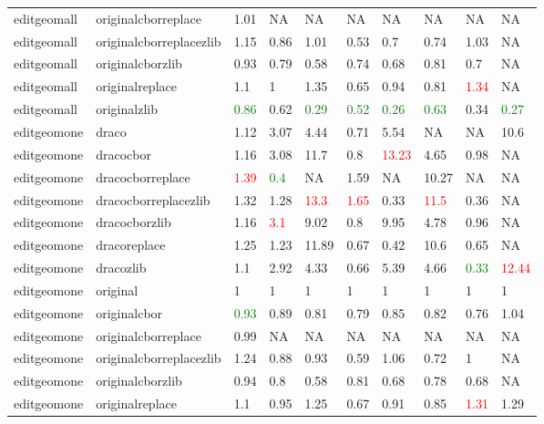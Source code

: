 \begin{landscape}
\begin{longtable}{llllllllll}
editgeomall & originalcborreplace & 1.01 & NA & NA & NA & NA & NA & NA & NA\\
editgeomall & originalcborreplacezlib & 1.15 & 0.86 & 1.01 & 0.53 & 0.7 & 0.74 & 1.03 & NA\\
editgeomall & originalcborzlib & 0.93 & 0.79 & 0.58 & 0.74 & 0.68 & 0.81 & 0.7 & NA\\
editgeomall & originalreplace & 1.1 & 1 & 1.35 & 0.65 & 0.94 & 0.81 & \textcolor{red}{1.34} & NA\\
editgeomall & originalzlib & \textcolor{green}{0.86} & 0.62 & \textcolor{green}{0.29} & \textcolor{green}{0.52} & \textcolor{green}{0.26} & \textcolor{green}{0.63} & 0.34 & \textcolor{green}{0.27}\\
editgeomone & draco & 1.12 & 3.07 & 4.44 & 0.71 & 5.54 & NA & NA & 10.6\\
editgeomone & dracocbor & 1.16 & 3.08 & 11.7 & 0.8 & \textcolor{red}{13.23} & 4.65 & 0.98 & NA\\
editgeomone & dracocborreplace & \textcolor{red}{1.39} & \textcolor{green}{0.4} & NA & 1.59 & NA & 10.27 & NA & NA\\
editgeomone & dracocborreplacezlib & 1.32 & 1.28 & \textcolor{red}{13.3} & \textcolor{red}{1.65} & 0.33 & \textcolor{red}{11.5} & 0.36 & NA\\
editgeomone & dracocborzlib & 1.16 & \textcolor{red}{3.1} & 9.02 & 0.8 & 9.95 & 4.78 & 0.96 & NA\\
editgeomone & dracoreplace & 1.25 & 1.23 & 11.89 & 0.67 & 0.42 & 10.6 & 0.65 & NA\\
editgeomone & dracozlib & 1.1 & 2.92 & 4.33 & 0.66 & 5.39 & 4.66 & \textcolor{green}{0.33} & \textcolor{red}{12.44}\\
editgeomone & original & 1 & 1 & 1 & 1 & 1 & 1 & 1 & 1\\
\rowcolor{lightgray}  editgeomone & originalcbor & \textcolor{green}{0.93} & 0.89 & 0.81 & 0.79 & 0.85 & 0.82 & 0.76 & 1.04\\
\rowcolor{lightgray}  editgeomone & originalcborreplace & 0.99 & NA & NA & NA & NA & NA & NA & NA\\
\rowcolor{lightgray}  editgeomone & originalcborreplacezlib & 1.24 & 0.88 & 0.93 & 0.59 & 1.06 & 0.72 & 1 & NA\\
\rowcolor{lightgray}  editgeomone & originalcborzlib & 0.94 & 0.8 & 0.58 & 0.81 & 0.68 & 0.78 & 0.68 & NA\\
\rowcolor{lightgray}  editgeomone & originalreplace & 1.1 & 0.95 & 1.25 & 0.67 & 0.91 & 0.85 & \textcolor{red}{1.31} & 1.29\\

\end{longtable}
\end{landscape}
